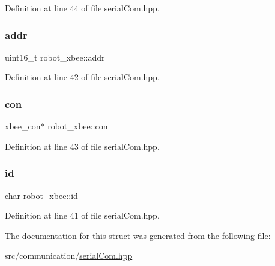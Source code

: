 Definition at line 44 of file serial\+Com.\+hpp.

\mbox{\label{structrobot__xbee_a4a917ff920a101fc016ac9d4ede5be46}} 
\subsubsection{\texorpdfstring{addr}{addr}}
{\footnotesize\ttfamily uint16\+\_\+t robot\+\_\+xbee\+::addr}



Definition at line 42 of file serial\+Com.\+hpp.

\mbox{\label{structrobot__xbee_a5920bd16ce0c8287541bd9d727146e91}} 
\subsubsection{\texorpdfstring{con}{con}}
{\footnotesize\ttfamily xbee\+\_\+con$\ast$ robot\+\_\+xbee\+::con}



Definition at line 43 of file serial\+Com.\+hpp.

\mbox{\label{structrobot__xbee_ab1a46fdd08142591bd40f198030e8892}} 
\subsubsection{\texorpdfstring{id}{id}}
{\footnotesize\ttfamily char robot\+\_\+xbee\+::id}



Definition at line 41 of file serial\+Com.\+hpp.



The documentation for this struct was generated from the following file\+:\begin{DoxyCompactItemize}
\item 
src/communication/\hyperlink{serial_com_8hpp}{serial\+Com.\+hpp}\end{DoxyCompactItemize}
